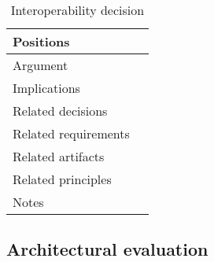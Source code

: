 \begin{table}[H]
\begin{tabular}{|l|l|}
Positions            &                                                                                                                                                                                                                                                             \\ \hline
Argument             &                                                                                                                                                                                                                                                             \\ \hline
Implications         &                                                                                                                                                                                                                                                             \\ \hline
Related decisions    &                                                                                                                                                                                                                                                             \\ \hline
Related requirements &                                                                                                                                                                                                                                                             \\ \hline
Related artifacts    &                                                                                                                                                                                                                                                             \\ \hline
Related principles   &                                                                                                                                                                                                                                                             \\ \hline
Notes                &                                                                                                                                                                                                                                                             \\ \hline
\end{tabular}
\caption{Interoperability decision}
\end{table}


\subsection{Architectural evaluation}